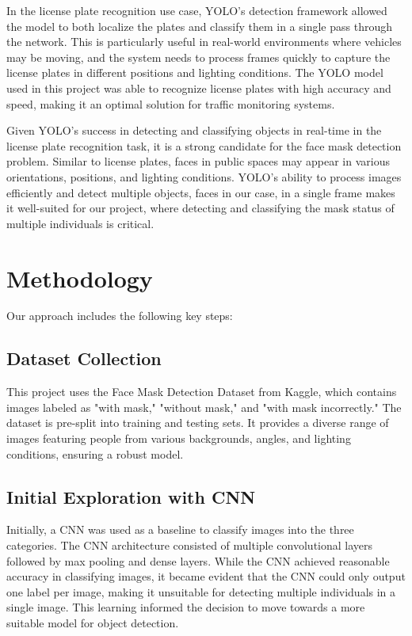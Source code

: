 \documentclass[11pt]{article}
\begin{document}
In the license plate recognition use case, YOLO’s detection framework allowed the model to both localize the plates and classify them in a single pass through the network. This is particularly useful in real-world environments where vehicles may be moving, and the system needs to process frames quickly to capture the license plates in different positions and lighting conditions. The YOLO model used in this project was able to recognize license plates with high accuracy and speed, making it an optimal solution for traffic monitoring systems.

Given YOLO's success in detecting and classifying objects in real-time in the license plate recognition task, it is a strong candidate for the face mask detection problem. Similar to license plates, faces in public spaces may appear in various orientations, positions, and lighting conditions. YOLO’s ability to process images efficiently and detect multiple objects, faces in our case, in a single frame makes it well-suited for our project, where detecting and classifying the mask status of multiple individuals is critical.

\section{Methodology} Our approach includes the following key steps:

\subsection{Dataset Collection} This project uses the Face Mask Detection Dataset from Kaggle, which contains images labeled as "with mask," "without mask," and "with mask incorrectly." The dataset is pre-split into training and testing sets. It provides a diverse range of images featuring people from various backgrounds, angles, and lighting conditions, ensuring a robust model.

\subsection{Initial Exploration with CNN} Initially, a CNN was used as a baseline to classify images into the three categories. The CNN architecture consisted of multiple convolutional layers followed by max pooling and dense layers. While the CNN achieved reasonable accuracy in classifying images, it became evident that the CNN could only output one label per image, making it unsuitable for detecting multiple individuals in a single image. This learning informed the decision to move towards a more suitable model for object detection.
\end{document}
